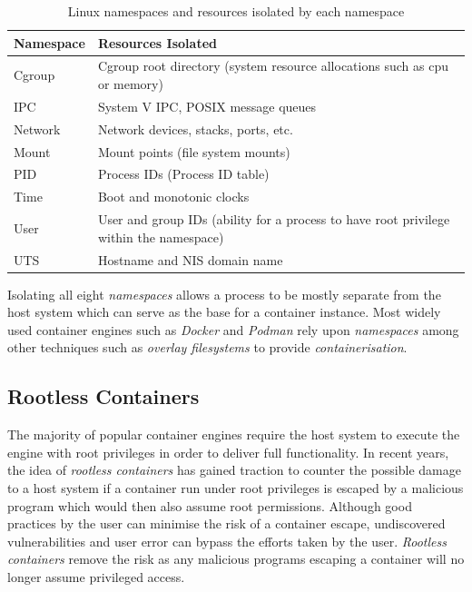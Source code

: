 \documentclass[hidelinks]{report}
\begin{document}
\begin{table}[h]
	\centering
	\begin{tabular}{ll}
		\toprule
		\textbf{Namespace} & \textbf{Resources Isolated} \\
		\midrule
		Cgroup & Cgroup root directory (system resource allocations such as cpu or memory) \\
		IPC & System V IPC, POSIX message queues \\
		Network & Network devices, stacks, ports, etc. \\
		Mount  & Mount points (file system mounts) \\
		PID & Process IDs (Process ID table) \\
		Time & Boot and monotonic clocks \\
		User & User and group IDs (ability for a process to have root privilege within the namespace) \\
		UTS & Hostname and NIS domain name \\
		\bottomrule
	\end{tabular}
	\caption{Linux namespaces and resources isolated by each namespace}
	\label{tab:table2}
\end{table}

Isolating all eight \textit{namespaces} allows a process to be mostly separate from the host system which can serve as the base for a container instance. Most widely used container engines such as \textit{Docker} and \textit{Podman} rely upon \textit{namespaces} among other techniques such as \textit{overlay filesystems} to provide \textit{containerisation}.

\subsection{Rootless Containers}
The majority of popular container engines require the host system to execute the engine with root privileges in order to deliver full functionality. In recent years, the idea of \textit{rootless containers} has gained traction to counter the possible damage to a host system if a container run under root privileges is escaped by a malicious program which would then also assume root permissions. Although good practices by the user can minimise the risk of a container escape, undiscovered vulnerabilities and user error can bypass the efforts taken by the user. \textit{Rootless containers} remove the risk as any malicious programs escaping a container will no longer assume privileged access.
\end{document}
